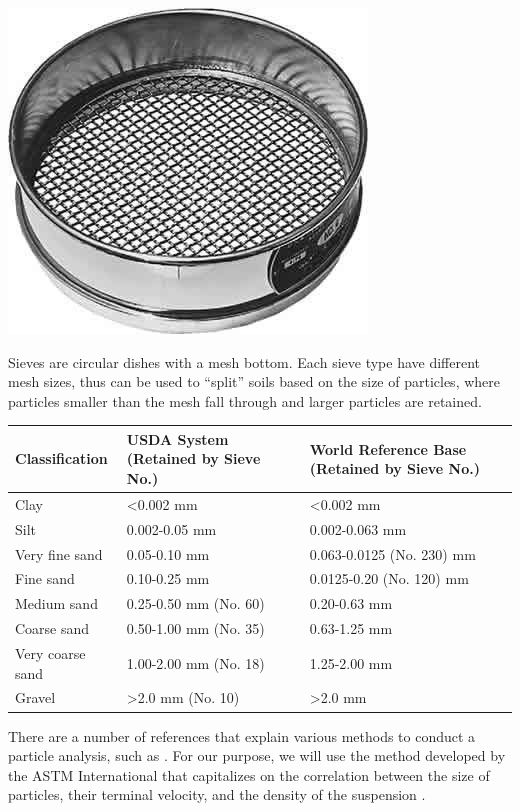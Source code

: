 \documentclass{tufte-handout}
\begin{document}
\begin{marginfigure}
	\includegraphics{8stainless_sieve.jpg}
	\caption{Sieves are circular dishes with a mesh bottom. Each sieve type have different mesh sizes, thus can be used to ``split'' soils based on the size of particles, where particles smaller than the mesh fall through and larger particles are retained.}
	\label{fig:8stainless_sieve}
\end{marginfigure}

\begin{table}
		\begin{tabular}{lll}\hline
Classification 					&  USDA System (Retained by Sieve No.) 		& World Reference Base (Retained by Sieve No.)\\ \hline\hline
			Clay 							& <0.002 mm 							& <0.002 mm \\
			Silt 							& 0.002-0.05 mm 					& 0.002-0.063 mm\\
			Very fine sand		& 0.05-0.10 mm						& 0.063-0.0125 (No. 230) mm\\
			Fine sand 				& 0.10-0.25 mm 						& 0.0125-0.20 (No. 120) mm\\
			Medium sand				& 0.25-0.50 mm (No. 60) 	& 0.20-0.63 mm\\
			Coarse sand 			& 0.50-1.00 mm (No. 35) 	& 0.63-1.25 mm\\
			Very coarse sand	& 1.00-2.00 mm (No. 18)		& 1.25-2.00 mm\\
			Gravel 						& >2.0 mm (No. 10)				& >2.0 mm \\ \hline
		\end{tabular}
\end{table}


There are a number of references that explain various methods to conduct a particle analysis, such as \citep{gee1986particle, day1965particle, beretta2014soil}. For our purpose, we will use the method developed by the ASTM International that capitalizes on the correlation between the size of particles, their terminal velocity, and the density of the suspension \citep{standard2007d422}. 
\end{document}
